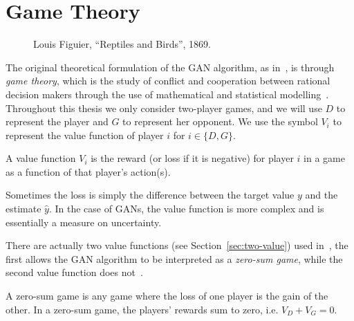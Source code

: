 \section{Game Theory}%
\label{sec:game-theory}

\vspace{1cm}

\begin{figure}[h]%
  \label{fig:paradise}
  \centering
  \caption{Louis Figuier, ``Reptiles and Birds'', 1869.}
\end{figure}

\vspace{1cm}

\noindent The original theoretical formulation of the GAN algorithm, as
in~\cite{ref:goodfellow-original}, is through \textit{game theory}, which is the
study of conflict and cooperation between rational decision makers through the
use of mathematical and statistical modelling~\cite{ref:myerson}. Throughout
this thesis we only consider two-player games, and we will use $D$ to represent
the player and $G$ to represent her opponent. We use the symbol $V_i$ to
represent the value function of player $i$ for $i \in \{D, G\}$.

\begin{definition}%
  \label{def:value-function}
  A \textnormal{\sffamily value function} $V_i$ is the reward (or loss if it is
  negative) for player $i$ in a game as a function of that player's action(s).
\end{definition}

\begin{remark}
  Sometimes the loss is simply the difference between the target value $y$ and
  the estimate $\hat{y}$. In the case of GANs, the value function is more
  complex and is essentially a measure on uncertainty.
\end{remark}

There are actually two value functions (see Section~\ref{sec:two-value}) used
in~\cite{ref:goodfellow-original}, the first allows the GAN algorithm to be
interpreted as a \textit{zero-sum game}, while the second value function does
not~\cite{ref:gidel-variational-2018}.

\begin{definition}%
  \label{def:zero-sum-game}
  A \textnormal{\sffamily zero-sum game} is any game where the loss of one
  player is the gain of the other. In a zero-sum game, the players' rewards sum
  to zero, i.e. $V_D + V_G = 0$.
\end{definition}

